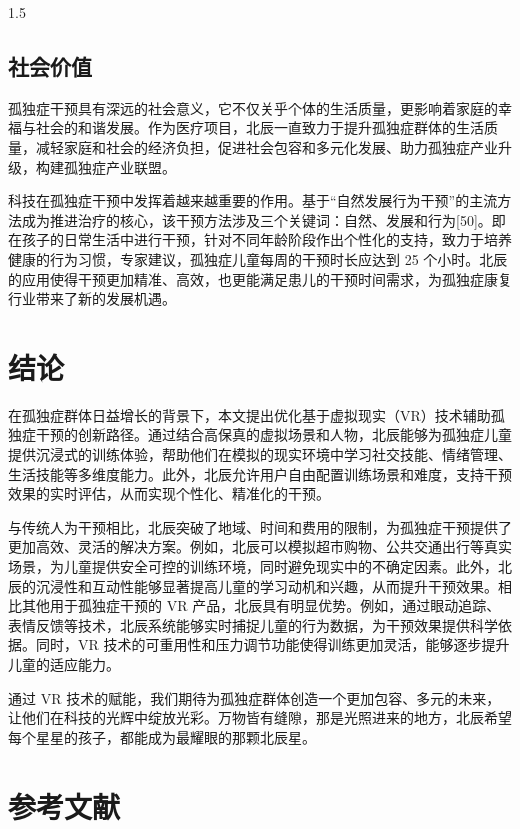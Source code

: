 \documentclass[zihao=-4]{ctexart}
\begin{document}
\begin{spacing}{1.5}
\subsection{社会价值}

孤独症干预具有深远的社会意义，它不仅关乎个体的生活质量，更影响着家庭的幸福与社会的和谐发展。作为医疗项目，北辰一直致力于提升孤独症群体的生活质量，减轻家庭和社会的经济负担，促进社会包容和多元化发展、助力孤独症产业升级，构建孤独症产业联盟。

科技在孤独症干预中发挥着越来越重要的作用。基于“自然发展行为干预”的主流方法成为推进治疗的核心，该干预方法涉及三个关键词：自然、发展和行为[50]。即在孩子的日常生活中进行干预，针对不同年龄阶段作出个性化的支持，致力于培养健康的行为习惯，专家建议，孤独症儿童每周的干预时长应达到 25 个小时。北辰的应用使得干预更加精准、高效，也更能满足患儿的干预时间需求，为孤独症康复行业带来了新的发展机遇。

\section*{结论}

在孤独症群体日益增长的背景下，本文提出优化基于虚拟现实（VR）技术辅助孤独症干预的创新路径。通过结合高保真的虚拟场景和人物，北辰能够为孤独症儿童提供沉浸式的训练体验，帮助他们在模拟的现实环境中学习社交技能、情绪管理、生活技能等多维度能力。此外，北辰允许用户自由配置训练场景和难度，支持干预效果的实时评估，从而实现个性化、精准化的干预。

与传统人为干预相比，北辰突破了地域、时间和费用的限制，为孤独症干预提供了更加高效、灵活的解决方案。例如，北辰可以模拟超市购物、公共交通出行等真实场景，为儿童提供安全可控的训练环境，同时避免现实中的不确定因素。此外，北辰的沉浸性和互动性能够显著提高儿童的学习动机和兴趣，从而提升干预效果。相比其他用于孤独症干预的 VR 产品，北辰具有明显优势。例如，通过眼动追踪、表情反馈等技术，北辰系统能够实时捕捉儿童的行为数据，为干预效果提供科学依据。同时，VR 技术的可重用性和压力调节功能使得训练更加灵活，能够逐步提升儿童的适应能力。

通过 VR 技术的赋能，我们期待为孤独症群体创造一个更加包容、多元的未来，让他们在科技的光辉中绽放光彩。万物皆有缝隙，那是光照进来的地方，北辰希望每个星星的孩子，都能成为最耀眼的那颗北辰星。

\newpage

\section*{参考文献}


\end{spacing}
\end{document}
